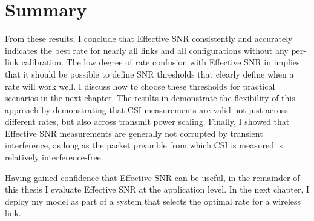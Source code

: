 \section{Summary}
From these results, I conclude that Effective SNR consistently and accurately indicates the best rate for nearly all links and all configurations without any per-link calibration. The low degree of rate confusion with Effective SNR in  implies that it should be possible to define SNR thresholds that clearly define when a rate will work well. I discuss how to choose these thresholds for practical scenarios in the next chapter. The results in  demonstrate the flexibility of this approach by demonstrating that CSI measurements are valid not just across different rates, but also across transmit power scaling. Finally, I showed that Effective SNR measurements are generally not corrupted by transient interference, as long as the packet preamble from which CSI is measured is relatively interference-free.

Having gained confidence that Effective SNR can be useful, in the remainder of this thesis I evaluate Effective SNR at the application level. In the next chapter, I deploy my model as part of a system that selects the optimal rate for a wireless link.


\ifx\mainfile\undefined

\fi
